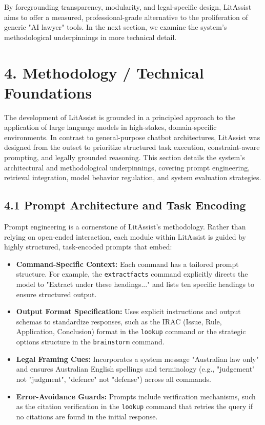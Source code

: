 \documentclass[12pt,a4paper]{article}
\begin{document}
By foregrounding transparency, modularity, and legal-specific design, LitAssist aims to offer a measured, professional-grade alternative to the proliferation of generic "AI lawyer" tools. In the next section, we examine the system's methodological underpinnings in more technical detail.

\section*{4. Methodology / Technical Foundations}

The development of LitAssist is grounded in a principled approach to the application of large language models in high-stakes, domain-specific environments. In contrast to general-purpose chatbot architectures, LitAssist was designed from the outset to prioritize structured task execution, constraint-aware prompting, and legally grounded reasoning. This section details the system's architectural and methodological underpinnings, covering prompt engineering, retrieval integration, model behavior regulation, and system evaluation strategies.

\subsection*{4.1 Prompt Architecture and Task Encoding}

Prompt engineering is a cornerstone of LitAssist's methodology. Rather than relying on open-ended interaction, each module within LitAssist is guided by highly structured, task-encoded prompts that embed:

\begin{itemize}
\item \textbf{Command-Specific Context:} Each command has a tailored prompt structure. For example, the \texttt{extractfacts} command explicitly directs the model to "Extract under these headings..." and lists ten specific headings to ensure structured output.

\item \textbf{Output Format Specification:} Uses explicit instructions and output schemas to standardize responses, such as the IRAC (Issue, Rule, Application, Conclusion) format in the \texttt{lookup} command or the strategic options structure in the \texttt{brainstorm} command.

\item \textbf{Legal Framing Cues:} Incorporates a system message "Australian law only" and ensures Australian English spellings and terminology (e.g., "judgement" not "judgment", "defence" not "defense") across all commands.

\item \textbf{Error-Avoidance Guards:} Prompts include verification mechanisms, such as the citation verification in the \texttt{lookup} command that retries the query if no citations are found in the initial response.
\end{itemize}
\end{document}
